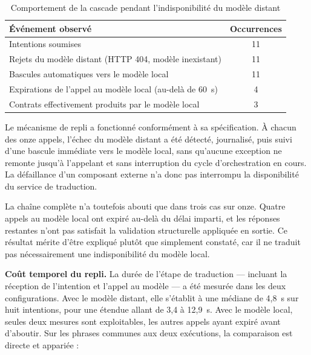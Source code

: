 \begin{table}[H]
    \centering
    \caption{Comportement de la cascade pendant l'indisponibilité du modèle distant}
    \label{tab:cascade-repli}
    \begin{tabular}{p{9.5cm}c}
        \toprule
        \textbf{Événement observé} & \textbf{Occurrences} \\
        \midrule
        Intentions soumises & 11 \\
        Rejets du modèle distant (HTTP 404, modèle inexistant) & 11 \\
        Bascules automatiques vers le modèle local & 11 \\
        Expirations de l'appel au modèle local (au-delà de 60~s) & 4 \\
        Contrats effectivement produits par le modèle local & 3 \\
        \bottomrule
    \end{tabular}
\end{table}

Le mécanisme de repli a fonctionné conformément à sa spécification. À chacun des onze appels, l'échec du modèle distant a été détecté, journalisé, puis suivi d'une bascule immédiate vers le modèle local, sans qu'aucune exception ne remonte jusqu'à l'appelant et sans interruption du cycle d'orchestration en cours. La défaillance d'un composant externe n'a donc pas interrompu la disponibilité du service de traduction.

La chaîne complète n'a toutefois abouti que dans trois cas sur onze. Quatre appels au modèle local ont expiré au-delà du délai imparti, et les réponses restantes n'ont pas satisfait la validation structurelle appliquée en sortie. Ce résultat mérite d'être expliqué plutôt que simplement constaté, car il ne traduit pas nécessairement une indisponibilité du modèle local.

\textbf{Coût temporel du repli.} La durée de l'étape de traduction — incluant la réception de l'intention et l'appel au modèle — a été mesurée dans les deux configurations. Avec le modèle distant, elle s'établit à une médiane de 4,8~s sur huit intentions, pour une étendue allant de 3,4 à 12,9~s. Avec le modèle local, seules deux mesures sont exploitables, les autres appels ayant expiré avant d'aboutir. Sur les phrases communes aux deux exécutions, la comparaison est directe et appariée :

